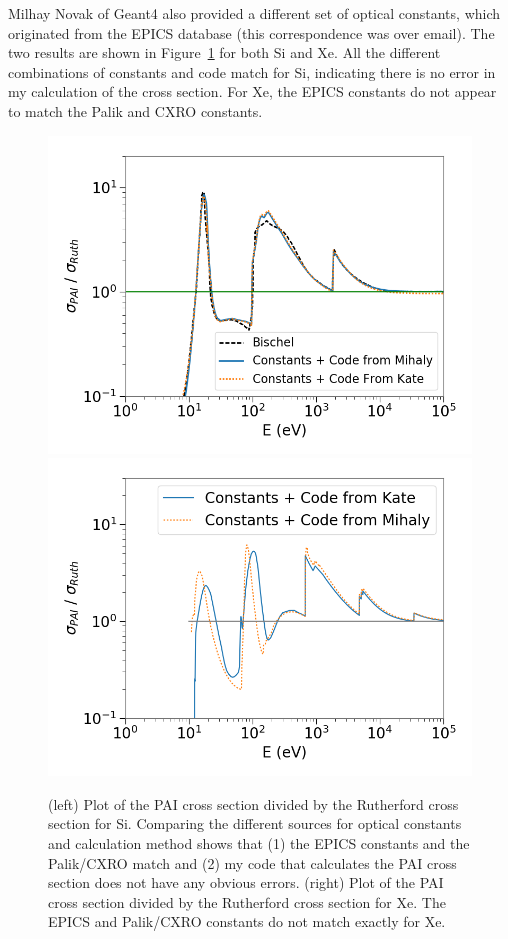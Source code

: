 Milhay Novak of Geant4 also provided a different set of optical constants, which originated from the EPICS database (this correspondence was over email). The two results are shown in Figure~\ref{fig:pai_different_consts} for both Si and Xe. All the different combinations of constants and code match for Si, indicating there is no error in my calculation of the cross section. For Xe, the EPICS constants do not appear to match the Palik and CXRO constants.

\begin{figure}[htbp]
\begin{center}
\includegraphics[width=\halffig]{figures/app/si_different_consts.png}
\includegraphics[width=\halffig]{figures/app/xe_different_consts.png}
\caption{ (left) Plot of the \acs{PAI} cross section divided by the Rutherford cross section for Si. Comparing the different sources for optical constants and calculation method shows that (1) the EPICS constants and the Palik/CXRO match and (2) my code that calculates the \acs{PAI} cross section does not have any obvious errors. (right) Plot of the \acs{PAI} cross section divided by the Rutherford cross section for Xe. The EPICS and Palik/CXRO constants do not match exactly for Xe.}
\label{fig:pai_different_consts}
\end{center}
\end{figure}

